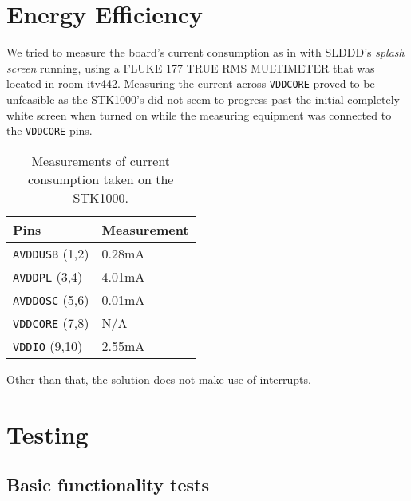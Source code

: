 \section{Energy Efficiency}

	We tried to measure the board's current consumption as in \cite{tdt4258-1} with SLDDD's \textit{splash screen} running, using a FLUKE 177 TRUE RMS MULTIMETER that was located in room itv442.
 	Measuring the current across \texttt{VDDCORE} proved to be unfeasible as the STK1000's did not seem to progress past the initial completely white screen when turned on while the measuring equipment was connected to the \texttt{VDDCORE} pins.

\begin{table}[h]
    \begin{tabular}{|l|l|}
    \hline
    Pins & Measurement \\ \hline
    \texttt{AVDDUSB} (1,2) & 0.28mA \\ \hline
    \texttt{AVDDPL} (3,4) & 4.01mA \\ \hline
    \texttt{AVDDOSC} (5,6) & 0.01mA \\ \hline
    \texttt{VDDCORE} (7,8) & N/A \\ \hline
    \texttt{VDDIO} (9,10) & 2.55mA \\ \hline
    \end{tabular}
    \caption{Measurements of current consumption taken on the STK1000.}
    \label{table-currentmeasurements}
\end{table}
	
	Other than that, the solution does not make use of interrupts.

\section{Testing}
\subsection{Basic functionality tests}
